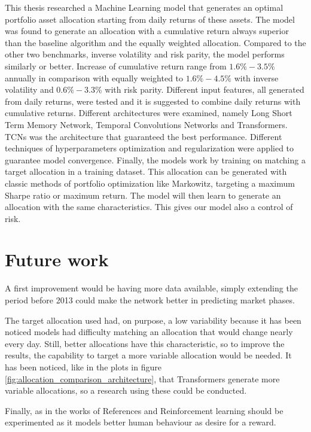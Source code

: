 This thesis researched a Machine Learning model that generates an optimal portfolio asset allocation starting from daily returns of these assets.
The model was found to generate an allocation with a cumulative return always superior than the baseline algorithm and the equally weighted allocation. Compared to the other two benchmarks, inverse volatility and risk parity, the model performs similarly or better. Increase of cumulative return range from $1.6\%-3.5\%$ annually in comparison with equally weighted to $1.6\%-4.5\%$ with inverse volatility and $0.6\%-3.3\%$ with risk parity. Different input features, all generated from daily returns, were tested and it is suggested to combine daily returns with cumulative returns. Different architectures were examined, namely Long Short Term Memory Network, Temporal Convolutions Networks and Transformers. TCNs was the architecture that guaranteed the best performance. Different techniques of hyperparameters optimization and regularization were applied to guarantee model convergence. Finally, the models work by training on matching a target allocation in a training dataset. This allocation can be generated with classic methods of portfolio optimization like Markowitz, targeting a maximum Sharpe ratio or maximum return. The model will then learn to generate an allocation with the same characteristics.
This gives our model also a control of risk.

\section{Future work}

A first improvement would be having more data available, simply extending the period before 2013 could make the network better in predicting market phases.


The target allocation used had, on purpose, a low variability because it has been noticed models had difficulty matching an allocation that would change nearly every day. Still, better allocations have this characteristic, so to improve the results, the capability to target a more variable allocation would be needed. It has been noticed, like in the plots in figure \ref{fig:allocation_comparison_architecture}, that Transformers generate more variable allocations, so a research using these could be conducted. 

Finally, as in the works of References \cite{weijs2018reinforcement} and \cite{kim2020portfolio} Reinforcement learning should be experimented as it models better human behaviour as desire for a reward. 